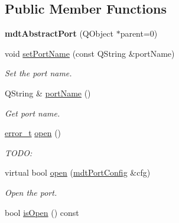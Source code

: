 \subsection*{Public Member Functions}
\begin{DoxyCompactItemize}
\item 
\hypertarget{classmdt_abstract_port_a35e7bff9413690833c832bf115da102f}{
{\bfseries mdtAbstractPort} (QObject $\ast$parent=0)}
\label{classmdt_abstract_port_a35e7bff9413690833c832bf115da102f}

\item 
void \hyperlink{classmdt_abstract_port_a0ca143d32fc677bac7c1cf0e04144932}{setPortName} (const QString \&portName)
\begin{DoxyCompactList}\small\item\em Set the port name. \end{DoxyCompactList}\item 
\hypertarget{classmdt_abstract_port_ac52fbd121f7cbb848a2f3e5d29fae615}{
QString \& \hyperlink{classmdt_abstract_port_ac52fbd121f7cbb848a2f3e5d29fae615}{portName} ()}
\label{classmdt_abstract_port_ac52fbd121f7cbb848a2f3e5d29fae615}

\begin{DoxyCompactList}\small\item\em Get port name. \end{DoxyCompactList}\item 
\hyperlink{classmdt_abstract_port_ad4121bb930c95887e77f8bafa065a85e}{error\_\-t} \hyperlink{classmdt_abstract_port_a4e0f0b7f9e24257677184e4bde10fdde}{open} ()
\begin{DoxyCompactList}\small\item\em TODO: \end{DoxyCompactList}\item 
virtual bool \hyperlink{classmdt_abstract_port_a4a8195c2bf580eb69ad5d90de86798e6}{open} (\hyperlink{classmdt_port_config}{mdtPortConfig} \&cfg)
\begin{DoxyCompactList}\small\item\em Open the port. \end{DoxyCompactList}\item 
\hypertarget{classmdt_abstract_port_a2122ae3141342ff38c8388e62b244e3b}{
bool \hyperlink{classmdt_abstract_port_a2122ae3141342ff38c8388e62b244e3b}{isOpen} () const }
\label{classmdt_abstract_port_a2122ae3141342ff38c8388e62b244e3b}


\end{DoxyCompactItemize}
